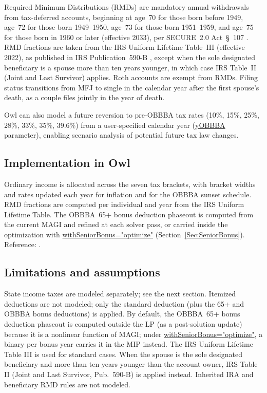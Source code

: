 \documentclass[fleqn,12pt]{report}
\newcommand{\code}[1]{\url{#1}}
\begin{document}
Required Minimum Distributions (RMDs) are mandatory annual withdrawals from
tax-deferred accounts, beginning at age~70 for those born before 1949,
age~72 for those born 1949--1950, age~73 for those born 1951--1959, and
age~75 for those born in 1960 or later (effective 2033), per SECURE~2.0 Act~§~107
\cite{secure2}.
RMD fractions are taken from the IRS Uniform Lifetime Table~III (effective
2022), as published in IRS Publication~590-B \cite{irs590b}, except when the
sole designated beneficiary is a spouse more than ten years younger, in which
case IRS Table~II (Joint and Last Survivor) applies.
Roth accounts are exempt from RMDs.
Filing status transitions from MFJ to single in the calendar year after the
first spouse's death, as a couple files jointly in the year of death.

Owl can also model a future reversion to pre-OBBBA tax rates
(10\%, 15\%, 25\%, 28\%, 33\%, 35\%, 39.6\%) from a user-specified calendar
year (\code{yOBBBA} parameter), enabling scenario analysis of potential
future tax law changes.

\subsection*{Implementation in Owl}

Ordinary income is allocated across the seven tax brackets, with bracket
widths and rates updated each year for inflation and for the OBBBA sunset
schedule.
RMD fractions are computed per individual and year from the IRS Uniform
Lifetime Table.
The OBBBA~65+ bonus deduction phaseout is computed from the current MAGI
and refined at each solver pass, or carried inside the optimization with
\code{withSeniorBonus="optimize"} (Section~\ref{Sec:SeniorBonus}).
Reference: \cite{irs17,secure2,obbba2025}.

\subsection*{Limitations and assumptions}

State income taxes are modeled separately; see the next section.
Itemized deductions are not modeled; only the standard deduction (plus the
65+ and OBBBA bonus deductions) is applied.
By default, the OBBBA~65+ bonus deduction phaseout is computed outside the LP (as a
post-solution update) because it is a nonlinear function of MAGI; under
\code{withSeniorBonus="optimize"}, a binary per bonus year carries it in the MIP instead.
The IRS Uniform Lifetime Table III is used for standard cases.
When the spouse is the sole designated beneficiary and more than ten years younger
than the account owner, IRS Table II (Joint and Last Survivor, Pub.\ 590-B) is applied instead.
Inherited IRA and beneficiary RMD rules are not modeled.
\end{document}

